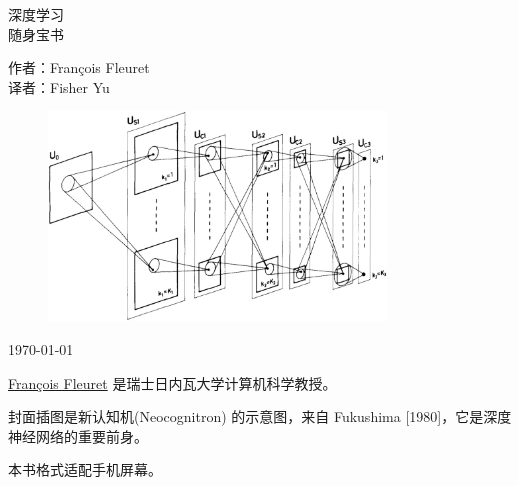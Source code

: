 \documentclass[oneside,11pt]{memoir}
\begin{document}
\thispagestyle{empty}

\begin{center}


{\huge 深度学习\\[0.75ex] 随身宝书}

\vspace*{4ex}

作者：François Fleuret \\
译者：Fisher Yu


\begin{figure}[!htbp]
\centering
\includegraphics[width=0.8\textwidth]{cover.png}
\end{figure}


\footnotesize \dotdate\today

\end{center}

\newpage



\href{https://fleuret.org/francois/}{François Fleuret} 是瑞士日内瓦大学计算机科学教授。

封面插图是新认知机(Neocognitron) 的示意图，来自 Fukushima [1980]，它是深度神经网络的重要前身。

本书格式适配手机屏幕。


\vspace*{-3ex}
\end{document}
